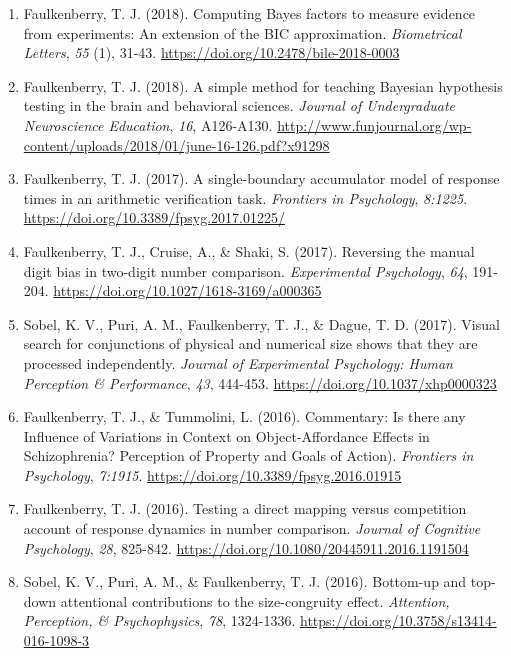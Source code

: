 \documentclass[article,10pt]{article}
\begin{document}
\begin{enumerate}
\item Faulkenberry, T. J. (2018). Computing Bayes factors to measure evidence from experiments: An extension of the BIC approximation. \emph{Biometrical Letters}, \emph{55} (1), 31-43. \url{https://doi.org/}\href{https://doi.org/10.2478/bile-2018-0003}{10.2478/bile-2018-0003}
\item Faulkenberry, T. J. (2018). A simple method for teaching Bayesian hypothesis testing in the brain and behavioral sciences. \emph{Journal of Undergraduate Neuroscience Education}, \emph{16}, A126-A130. \url{http://www.funjournal.org/wp-content/uploads/2018/01/june-16-126.pdf?x91298}
\item Faulkenberry, T. J. (2017). A single-boundary accumulator model of response times in an arithmetic verification task. \emph{Frontiers in Psychology}, \emph{8:1225}. \url{https://doi.org/}\href{http://dx.doi.org/10.3389/fpsyg.2017.01225}{10.3389/fpsyg.2017.01225/}
\item Faulkenberry, T. J., Cruise, A., \& Shaki, S. (2017). Reversing the manual digit bias in two-digit number comparison. \emph{Experimental Psychology}, \emph{64}, 191-204. \url{https://doi.org/}\href{http://dx.doi.org/10.1027/1618-3169/a000365}{10.1027/1618-3169/a000365}
\item Sobel, K. V., Puri, A. M., Faulkenberry, T. J., \& Dague, T. D. (2017). Visual search for conjunctions of physical and numerical size shows that they are processed independently. \emph{Journal of Experimental Psychology: Human Perception \& Performance}, \emph{43}, 444-453. \url{https://doi.org/}\href{http://dx.doi.org/10.1037/xhp0000323}{10.1037/xhp0000323}
\item Faulkenberry, T. J., \& Tummolini, L. (2016). Commentary: Is there any Influence of Variations in Context on Object-Affordance Effects in Schizophrenia? Perception of Property and Goals of Action). \emph{Frontiers in Psychology}, \emph{7:1915}. \url{https://doi.org/}\href{http://dx.doi.org/10.3389/fpsyg.2016.01915}{10.3389/fpsyg.2016.01915}
\item Faulkenberry, T. J. (2016). Testing a direct mapping versus competition account of response dynamics in number comparison. \emph{Journal of Cognitive Psychology}, \emph{28}, 825-842. \url{https://doi.org/}\href{http://dx.doi.org/10.1080/20445911.2016.1191504}{10.1080/20445911.2016.1191504}
\item Sobel, K. V., Puri, A. M., \& Faulkenberry, T. J. (2016). Bottom-up and top-down attentional contributions to the size-congruity effect. \emph{Attention, Perception, \& Psychophysics}, \emph{78}, 1324-1336. \url{https://doi.org/}\href{http://dx.doi.org/10.3758/s13414-016-1098-3}{10.3758/s13414-016-1098-3}

\end{enumerate}
\end{document}
